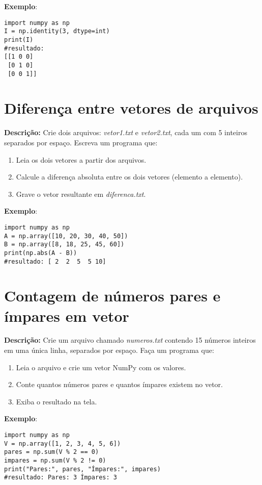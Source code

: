 \textbf{Exemplo}:
\begin{verbatim}
import numpy as np
I = np.identity(3, dtype=int)
print(I)
#resultado:
[[1 0 0]
 [0 1 0]
 [0 0 1]]
\end{verbatim}

\section{Diferença entre vetores de arquivos}

\textbf{Descrição:} Crie dois arquivos: \textit{vetor1.txt} e \textit{vetor2.txt}, cada um com 5 inteiros separados por espaço. Escreva um programa que:

\begin{enumerate}
    \item Leia os dois vetores a partir dos arquivos.
    \item Calcule a diferença absoluta entre os dois vetores (elemento a elemento).
    \item Grave o vetor resultante em \textit{diferenca.txt}.
\end{enumerate}

\textbf{Exemplo}:
\begin{verbatim}
import numpy as np
A = np.array([10, 20, 30, 40, 50])
B = np.array([8, 18, 25, 45, 60])
print(np.abs(A - B))
#resultado: [ 2  2  5  5 10]
\end{verbatim}

\section{Contagem de números pares e ímpares em vetor}

\textbf{Descrição:} Crie um arquivo chamado \textit{numeros.txt} contendo 15 números inteiros em uma única linha, separados por espaço. Faça um programa que:

\begin{enumerate}
    \item Leia o arquivo e crie um vetor NumPy com os valores.
    \item Conte quantos números pares e quantos ímpares existem no vetor.
    \item Exiba o resultado na tela.
\end{enumerate}

\textbf{Exemplo}:
\begin{verbatim}
import numpy as np
V = np.array([1, 2, 3, 4, 5, 6])
pares = np.sum(V % 2 == 0)
impares = np.sum(V % 2 != 0)
print("Pares:", pares, "Ímpares:", impares)
#resultado: Pares: 3 Ímpares: 3
\end{verbatim}




